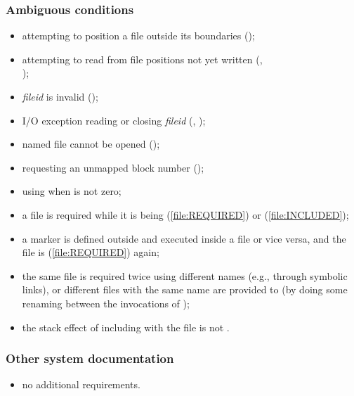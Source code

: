\subsubsection{Ambiguous conditions} %
\begin{itemize}
\item attempting to position a file outside its boundaries
	();
\item attempting to read from file positions not yet written
	(, \\ );
\item \emph{fileid} is invalid ();
\item I/O exception reading or closing \emph{fileid}
	(,
	 );
\item named file cannot be opened
	();
\item requesting an unmapped block number
	();
\item using  when
	 is not zero;
%
%
\item a file is required while it is being 
	(\ref{file:REQUIRED}) or  (\ref{file:INCLUDED});
\item a marker is defined outside and executed inside a file or
	vice versa, and the file is 
	(\ref{file:REQUIRED}) again;
\item the same file is required twice using different names
	(e.g., through symbolic links), or different files with the
	same name are provided to  (by doing
	some renaming between the invocations of );
\item the stack effect of including with
	 the file is not .
\end{itemize}

\subsubsection{Other system documentation} %
\begin{itemize}
\item no additional requirements.
\end{itemize}


